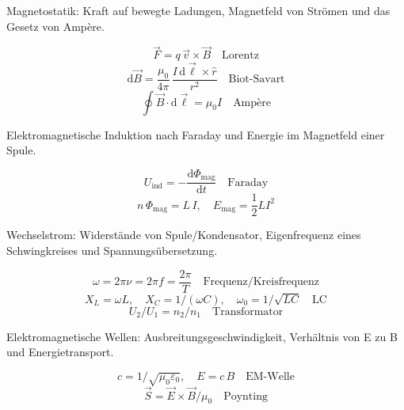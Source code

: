 \begin{runintext}
Magnetostatik: Kraft auf bewegte Ladungen, Magnetfeld von Strömen und das Gesetz von Ampère.
\end{runintext}
\begin{formulabox}
\[ \vec{F} = q\,\vec{v}\times\vec{B} \quad \text{Lorentz} \]
\formulasep
\[ \mathrm{d}\vec{B} = \frac{\mu_0}{4\pi}\,\frac{I\,\mathrm{d}\vec{\ell}\times\hat{r}}{r^2} \quad \text{Biot-Savart} \]
\formulasep
\[ \oint \vec{B}\cdot\mathrm{d}\vec{\ell} = \mu_0 I \quad \text{Ampère} \]
\end{formulabox}

\begin{runintext}
Elektromagnetische Induktion nach Faraday und Energie im Magnetfeld einer Spule.
\end{runintext}
\begin{formulabox}
\[ U_{\mathrm{ind}} = -\frac{\mathrm{d}\Phi_{\mathrm{mag}}}{\mathrm{d}t} \quad \text{Faraday} \]
\formulasep
\[ n\,\Phi_{\mathrm{mag}} = L\,I, \quad E_{\mathrm{mag}} = \frac{1}{2}LI^2 \]
\end{formulabox}

\begin{runintext}
Wechselstrom: Widerstände von Spule/Kondensator, Eigenfrequenz eines Schwingkreises und Spannungsübersetzung.
\end{runintext}
\begin{formulabox}
\[ \omega = 2\pi\nu = 2\pi f = \frac{2\pi}{T} \quad \text{Frequenz/Kreisfrequenz} \]
\formulasep
\[ X_L = \omega L, \quad X_C = 1/(\omega C), \quad \omega_0 = 1/\sqrt{LC} \quad \text{LC} \]
\formulasep
\[ U_2/U_1 = n_2/n_1 \quad \text{Transformator} \]
\end{formulabox}

\begin{runintext}
Elektromagnetische Wellen: Ausbreitungsgeschwindigkeit, Verhältnis von E zu B und Energietransport.
\end{runintext}
\begin{formulabox}
\[ c = 1/\sqrt{\mu_0\varepsilon_0}, \quad E = c\,B \quad \text{EM-Welle} \]
\formulasep
\[ \vec{S} = \vec{E}\times\vec{B}/\mu_0 \quad \text{Poynting} \]
\end{formulabox}

